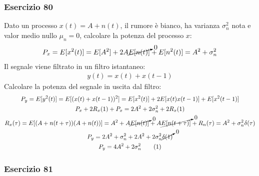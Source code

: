 \documentclass{article}
\newcommand{\tageq}{\tag{\stepcounter{equation}\theequation}}
\begin{document}
\subsubsection*{Esercizio 80}

Dato un processo $x(t)=A+n(t)$, il rumore è bianco, ha varianza $\sigma_n^2$ nota e valor medio nullo $\mu_n=0$, calcolare la potenza del processo $x$:
\begin{gather}
    P_x=E[x^2(t)]=E[A^2]+2A\cancelto{0}{E[n(t)]}+E[n^2(t)]=A^2+\sigma_n^2
\end{gather}
Il segnale viene filtrato in un filtro istantaneo:
\begin{gather*}
    y(t)=x(t)+x(t-1)
\end{gather*}
Calcolare la potenza del segnale in uscita dal filtro:
\begin{gather*}
    P_y=E[y^2(t)]=E[(x(t)+x(t-1))^2]=E[x^2(t)]+2E[x(t)x(t-1)]+E[x^2(t-1)]\\
    P_x+2R_x(1)+P_x=2A^2+2\sigma_n^2+2R_x(1)\\
    R_x(\tau)=E[(A+n(t+\tau))(A+n(t))]=A^2+A\cancelto{0}{E[n(t)]}+A\cancelto{0}{E[n(t+\tau)]}+R_n(\tau)=A^2+\sigma_n^2\delta(\tau)\\
    P_y=2A^2+\sigma_n^2+2A^2+2\sigma_n^2\cancelto{0}{\delta(1)}\\
    P_y=4A^2+2\sigma_n^2\tageq
\end{gather*}

\subsubsection*{Esercizio 81}
\end{document}
